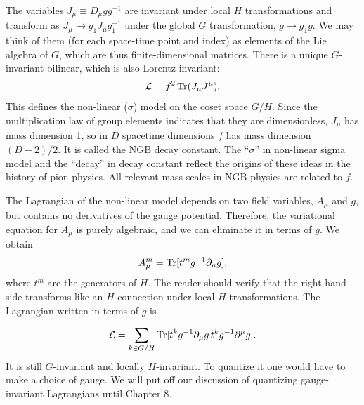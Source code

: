 The variables $J_\mu\equiv D_\mu gg^{-1}$ are invariant under local $H$
transformations and transform as $J_\mu\to g_1J_\mu g_1^{-1}$ under the global
$G$ transformation, $g\to g_1g$. We may think of them (for each space-time
point and index) as elements of the Lie algebra of $G$, which are thus
finite-dimensional matrices. There is a unique $G$-invariant bilinear, which is
also Lorentz-invariant:
\begin{equation}
  \mathcal L=f^2\operatorname{Tr}(J_\mu J^\mu).
  \label{eq:7.9}
\end{equation}
This defines the non-linear ($\sigma$) model on the coset space $G/H$. Since
the multiplication law of group elements indicates that they are dimensionless,
$J_\mu$ has mass dimension 1, so in $D$ spacetime dimensions $f$ has mass
dimension $(D-2)/2$. It is called
the NGB decay constant. The ``$\sigma$'' in non-linear sigma model and the
``decay'' in decay constant reflect the origins of these ideas in the history
of pion physics. All relevant mass scales in NGB physics are related to $f$.

The Lagrangian of the non-linear model depends on two field variables, $A_\mu$
and $g$, but contains no derivatives of the gauge potential. Therefore, the
variational equation for $A_\mu$ is purely algebraic, and we can eliminate it in
terms of $g$. We obtain
\begin{equation*}
  A_\mu^m=\operatorname{Tr}[t^m g^{-1}\partial_\mu g],
\end{equation*}
where $t^m$ are the generators of $H$. The reader should verify that the
right-hand side transforms like an $H$-connection under local $H$
transformations. The Lagrangian written in terms of $g$ is


\begin{equation*}
  \mathcal L=\sum_{k\in G/H}\operatorname{Tr}[t^k g^{-1}\partial_\mu g\,t^k g^{-1}\partial^\mu g].
\end{equation*}
It is still $G$-invariant and locally $H$-invariant. To quantize it one would
have to make a choice of gauge. We will put off our discussion of quantizing
gauge-invariant Lagrangians until Chapter 8.

